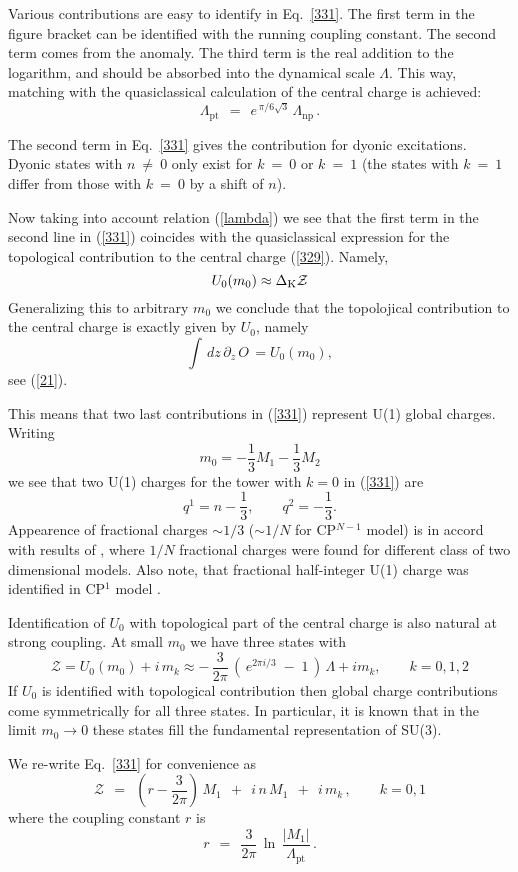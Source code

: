 \documentclass[epsfig,12pt]{article}
\def\beq{\begin{equation}}
\def\eeq{\end{equation}}
\def\beq{\begin{equation}}
\def\eeq{\end{equation}}
\newcommand{\p}{\partial}
\newcommand{\mc}[1]{\mathcal{#1}}
\begin{document}
	Various contributions are easy to identify in Eq.~\eqref{331}.
	The first term in the figure bracket can be identified with the running coupling constant.
	The second term comes from the anomaly.
	The third term is the real addition to the logarithm, and should be absorbed into the dynamical scale $ \Lambda $.
	This way, matching with the quasiclassical calculation of the central charge is achieved:
\beq
	\Lambda_\text{pt} ~~=~~ e^{\, \pi / 6 \sqrt{3}}\, \Lambda_\text{np}\,.
\label{lambda}
\eeq

	The second term in Eq.~\eqref{331} gives the contribution for dyonic excitations.
	Dyonic states with $ n ~ \neq~ 0 $ only exist for $ k ~=~ 0 $ or $ k ~=~ 1 $
	(the states with $ k ~=~ 1 $ differ from those with $ k ~=~ 0 $ by a shift of $ n $).

Now taking into account relation (\ref{lambda}) we see that  the first term in the second line in  (\ref{331})
coincides
with the quasiclassical expression for the topological contribution to the central charge (\ref{329}).
Namely,
\beq
U_0(m_0)\approx \Delta_{\rm K}{\mathcal Z}
\label{UapproxT}
\eeq
Generalizing this to arbitrary $m_0$ we conclude that the topolojical contribution to the central charge is exactly given by $U_0$, namely
\beq
\int\, dz\, \p_z\, O \, = U_0(m_0),
\label{U=T}
\eeq
see (\ref{21}).

This means that two last contributions in (\ref{331}) represent U(1) global charges.
Writing
\beq
m_0= -\frac13 M_1  -\frac13 M_2
\eeq
we see that two U(1) charges for the tower with $k=0$ in (\ref{331}) are
\beq
q^1= n-\frac13, \qquad q^2 = -\frac13.
\label{qcharges}
\eeq
Appearence of fractional charges $\sim 1/3$ ($\sim 1/N$ for CP$^{N-1}$ model) is in accord with results of
\cite{FeIn}, where $1/N$ fractional charges were found for different class of two dimensional models.
Also note, that fractional half-integer U(1) charge was identified in CP$^1$ model \cite{SVZw}.

Identification of $U_0$ with topological part of the central charge is also natural at strong coupling.
At small $m_0$ we have three states with
\beq
\mc{Z} = U_0(m_0)  +i\, m_k \approx -\, \frac{3}{2\pi}\, \left(\, e^{2 \pi i / 3 } \;-\; 1 \,\right) \, \Lambda
+im_k, \qquad k=0,1,2
\eeq
If $U_0$ is identified with topological contribution then global charge contributions come symmetrically for all three states. In particular, it is known that in the limit $m_0\to 0$ these states fill the fundamental representation of SU(3).


	We re-write Eq.~\eqref{331} for convenience as 
\beq
\label{weak}
	\mc{Z}  ~~=~~  \left(r -\frac{3}{2\pi} \right)\, M_1  ~~+~~  i\, n  \, M_1
	~~+~~ i\,  m_k  \,, \qquad k=0,1
\eeq
	where the coupling constant $ r $ is
\beq
	r  ~~=~~  \frac{3}{2\pi}\,  \ln\, \frac {   |M_1|   }
                                               {  \Lambda_\text{pt}  } \, .
\eeq
\end{document}
